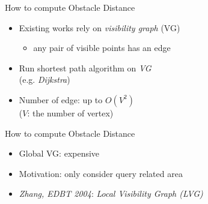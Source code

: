 \begin{frame}{How to compute Obstacle Distance}
\begin{minipage}{.4\textwidth}
\begin{itemize}
\item \small Existing works rely on \textit{visibility graph} (VG)
    \begin{itemize}
        \item \small any pair of visible points has an edge
    \end{itemize}
\item \small Run shortest path algorithm on \textit{VG}\\
    \tiny{(e.g. \textit{Dijkstra})}
\item \small {Number of edge: up to $O(V^2)$\\
            \tiny{($V$: the number of vertex})}
\end{itemize}
\end{minipage}%
\begin{minipage}{.6\textwidth}
\begin{adjustbox}{max totalsize={.9\textwidth}{.9\textheight}, right}
\end{adjustbox}
\end{minipage}
\end{frame}

\begin{frame}{How to compute Obstacle Distance}
\begin{minipage}{.4\textwidth}
\begin{itemize}
\item \small Global VG: expensive
\item \small Motivation: only consider query related area
\item \small {\textit{Zhang, EDBT 2004}: \textit{Local Visibility Graph (LVG)}}
\end{itemize}
\end{minipage}%
\begin{minipage}{.6\textwidth}
\begin{adjustbox}{max totalsize={.9\textwidth}{.9\textheight}, right}
\end{adjustbox}
\end{minipage}
\end{frame}

